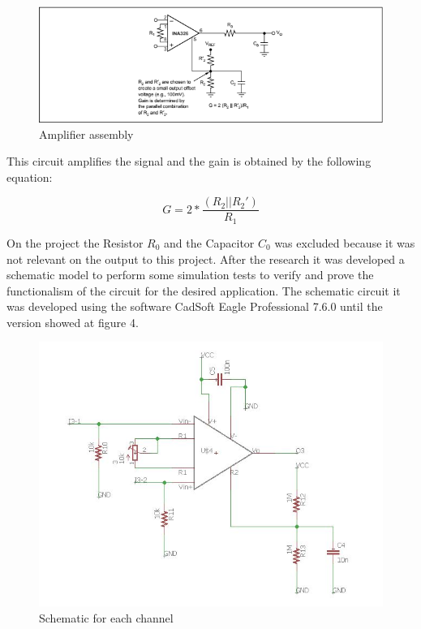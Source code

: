 \begin{figure}[!htpb]
\centering
\includegraphics[scale=0.8]{textual-elements/hardware/Texas}
\caption{Amplifier assembly}
\end{figure}

This circuit amplifies the signal and the gain is obtained by the following equation:

$$G=2*\frac{(R_2||R_2 ')}{R_1}$$

On the project the Resistor $R_0$ and the Capacitor $C_0$ was excluded because it was not relevant on the output to this project. After the research it was developed a schematic model to perform some simulation tests to verify and prove the functionalism of the circuit for the desired application. The schematic circuit it was developed using the software CadSoft Eagle Professional 7.6.0 until the version showed at figure 4.

\begin{figure}[!htpb]
\centering
\includegraphics[scale=0.7]{textual-elements/hardware/INA}
\caption{Schematic for each channel}
\end{figure}

